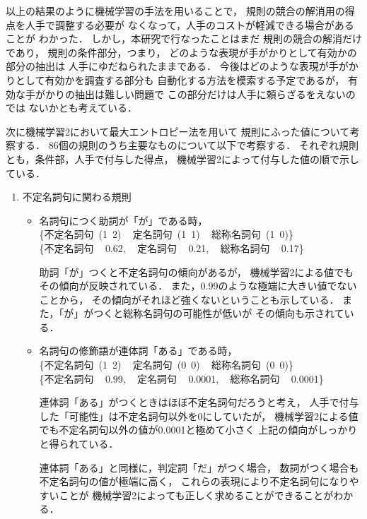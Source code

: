 以上の結果のように機械学習の手法を用いることで，
規則の競合の解消用の得点を人手で調整する必要が
なくなって，人手のコストが軽減できる場合があることが
わかった．
しかし，本研究で行なったことはまだ
規則の競合の解消だけであり，
規則の条件部分，つまり，
どのような表現が手がかりとして有効かの部分の抽出は
人手にゆだねられたままである．
今後はどのような表現が手がかりとして有効かを調査する部分も
自動化する方法を模索する予定であるが，
有効な手がかりの抽出は難しい問題で
この部分だけは人手に頼らざるをえないのでは
ないかとも考えている．

次に機械学習2において最大エントロピー法を用いて
規則にふった値について考察する．
86個の規則のうち主要なものについて以下で考察する．
それぞれ規則とも，条件部，人手で付与した得点，
機械学習2によって付与した値の順で示している．
\begin{enumerate}
\item 
  不定名詞句に関わる規則

  \begin{itemize}
  \item 
    名詞句につく助詞が「が」である時，\\
    \mbox{\{\mbox{不定名詞句} (1 2) \,
      \mbox{定名詞句}   (1 1) \,
      \mbox{総称名詞句} (1 0)\}}\\
    \mbox{\{\mbox{不定名詞句} \, 0.62, \,
      \mbox{定名詞句}   \, 0.21, \,
      \mbox{総称名詞句} \, 0.17\}}

    助詞「が」つくと不定名詞句の傾向があるが，
    機械学習2による値でもその傾向が反映されている．
    また，0.99のような極端に大きい値でないことから，
    その傾向がそれほど強くないということも示している．
    また，「が」がつくと総称名詞句の可能性が低いが
    その傾向も示されている．
    
  \item 
    名詞句の修飾語が連体詞「ある」である時，\\
    \mbox{\{\mbox{不定名詞句} (1 2) \,
      \mbox{定名詞句}   (0 0) \,
      \mbox{総称名詞句} (0 0)\}}\\
    \mbox{\{\mbox{不定名詞句} \, 0.99, \,
      \mbox{定名詞句}   \, 0.0001, \,
      \mbox{総称名詞句} \, 0.0001\}}

    連体詞「ある」がつくときはほぼ不定名詞句だろうと考え，
   人手で付与した「可能性」は不定名詞句以外を0にしていたが，
   機械学習2による値でも不定名詞句以外の値が0.0001と極めて小さく
   上記の傾向がしっかりと得られている．

   連体詞「ある」と同様に，判定詞「だ」がつく場合，
   数詞がつく場合も不定名詞句の値が極端に高く，
   これらの表現により不定名詞句になりやすいことが
   機械学習2によっても正しく求めることができることがわかる．
   

\end{itemize}
\end{enumerate}
